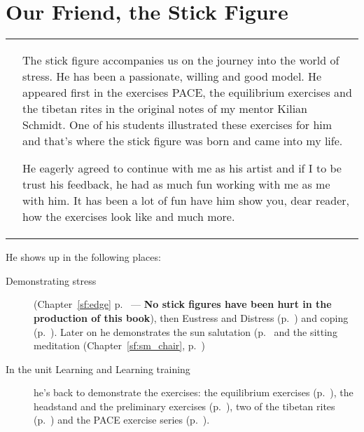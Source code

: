 \documentclass[../main.tex]{subfiles}
\begin{document}
\section{Our Friend, the Stick Figure}

\begin{tabular}{p{2cm}p{9.5cm}}
      \raisebox{-1\totalheight}{  \texttt{[image: water]} } \label{sf:water} &

The stick figure accompanies us on the journey into the world of stress. He has been a passionate, willing and good model.
He appeared first in the exercises PACE, the equilibrium exercises and the tibetan rites in the original notes of my mentor Kilian Schmidt.
One of his students illustrated these exercises for him and that's where the stick figure was born and came into my life.

He eagerly agreed to continue with me as his artist and if I to be trust his feedback, he had as much fun working with me as me with him.
  It has been a lot of fun have him show you, dear reader, how the exercises look like and much more.
  \end{tabular}

He shows up in the following places:
\begin{description}
\item[Demonstrating stress] (Chapter~\ref{sf:edge} p.~\pageref{sf:edge} ---
  \textbf{No stick figures have been hurt in the production of this book}),
  then Eustress and Distress (p.~\pageref{sf:eustress}) and 
  coping (p.~\pageref{sf:coping}).
  Later on he demonstrates the sun salutation (p.~\pageref{sf:yoga} and the sitting meditation (Chapter~\ref{sf:sm_chair}, p.~\pageref{sf:sm_chair})
\item[In the unit Learning and Learning training] he's back to demonstrate the exercises: the equilibrium exercises (p.~\pageref{sf:equil}),
  the headstand and the preliminary exercises (p.~\pageref{sf:headstand}),
  two of the tibetan rites (p.~\pageref{sf:tibetan})
  and the PACE exercise series (p.~\pageref{sf:PACE}).
\end{description}
\end{document}
